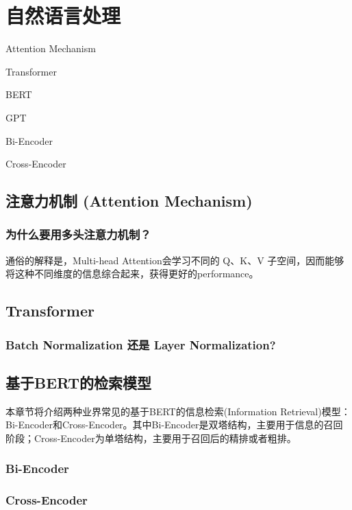 \chapter{自然语言处理}
\begin{introduction}
  \item Attention Mechanism
  \item Transformer
  \item BERT
  \item GPT
  \item Bi-Encoder
  \item Cross-Encoder
\end{introduction}

\section{注意力机制 (Attention Mechanism)}


\subsection{为什么要用多头注意力机制？}

通俗的解释是，Multi-head Attention会学习不同的 Q、K、V 子空间，因而能够将这种不同维度的信息综合起来，获得更好的performance。




\section{Transformer}

\subsection{Batch Normalization 还是 Layer Normalization?}

\section{基于BERT的检索模型}

本章节将介绍两种业界常见的基于BERT的信息检索(Information Retrieval)模型：Bi-Encoder和Cross-Encoder。其中Bi-Encoder是双塔结构，主要用于信息的召回阶段；Cross-Encoder为单塔结构，主要用于召回后的精排或者粗排。

\subsection{Bi-Encoder}

\subsection{Cross-Encoder}
